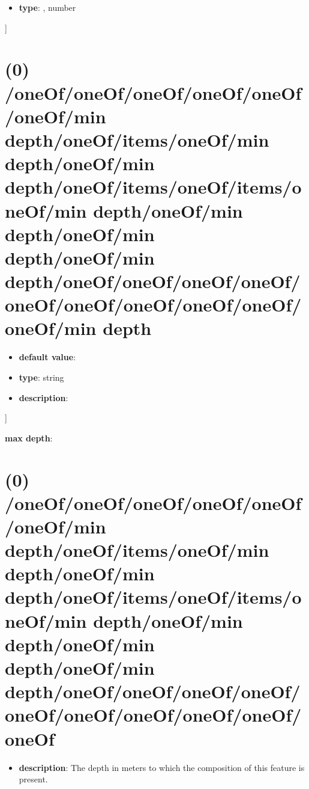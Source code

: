\begin{itemize}[leftmargin=5em]\item {\bf type}: , number\end{itemize}]\section{(0) /oneOf/oneOf/oneOf/oneOf/oneOf/oneOf/min depth/oneOf/items/oneOf/min depth/oneOf/min depth/oneOf/items/oneOf/items/oneOf/min depth/oneOf/min depth/oneOf/min depth/oneOf/min depth/oneOf/oneOf/oneOf/oneOf/oneOf/oneOf/oneOf/oneOf/oneOf/oneOf/min depth}
\begin{itemize}[leftmargin=0em]\item {\bf default value}: 
\item {\bf type}: string
\item {\bf description}: 
\end{itemize}]\item {\bf max depth}: \section{(0) /oneOf/oneOf/oneOf/oneOf/oneOf/oneOf/min depth/oneOf/items/oneOf/min depth/oneOf/min depth/oneOf/items/oneOf/items/oneOf/min depth/oneOf/min depth/oneOf/min depth/oneOf/min depth/oneOf/oneOf/oneOf/oneOf/oneOf/oneOf/oneOf/oneOf/oneOf/oneOf}
\begin{itemize}[leftmargin=0em]\item {\bf description}: The depth in meters to which the composition of this feature is present.
\end{itemize}
